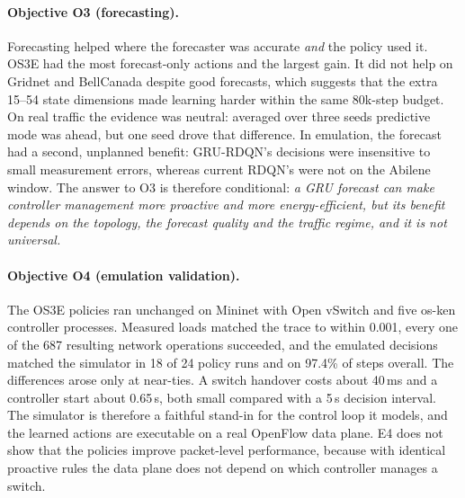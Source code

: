\paragraph{Objective O3 (forecasting).} Forecasting helped where the forecaster was accurate \emph{and} the policy used it. OS3E had the most forecast-only actions and the largest gain. It did not help on Gridnet and BellCanada despite good forecasts, which suggests that the extra 15--54 state dimensions made learning harder within the same 80k-step budget. On real traffic the evidence was neutral: averaged over three seeds predictive mode was ahead, but one seed drove that difference. In emulation, the forecast had a second, unplanned benefit: GRU-RDQN's decisions were insensitive to small measurement errors, whereas current RDQN's were not on the Abilene window. The answer to O3 is therefore conditional: \emph{a GRU forecast can make controller management more proactive and more energy-efficient, but its benefit depends on the topology, the forecast quality and the traffic regime, and it is not universal.}

\paragraph{Objective O4 (emulation validation).} The OS3E policies ran unchanged on Mininet with Open vSwitch and five os-ken controller processes. Measured loads matched the trace to within 0.001, every one of the 687 resulting network operations succeeded, and the emulated decisions matched the simulator in 18 of 24 policy runs and on 97.4\% of steps overall. The differences arose only at near-ties. A switch handover costs about 40\,ms and a controller start about 0.65\,s, both small compared with a 5\,s decision interval. The simulator is therefore a faithful stand-in for the control loop it models, and the learned actions are executable on a real OpenFlow data plane. E4 does not show that the policies improve packet-level performance, because with identical proactive rules the data plane does not depend on which controller manages a switch.

